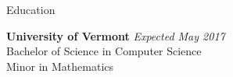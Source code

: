 \documentclass{resume} %
\begin{document}

\begin{rSection}{Education}

{\bf University of Vermont} \hfill {\em Expected May 2017} \\ 
Bachelor of Science in Computer Science \\ %
Minor in Mathematics
\end{rSection}

\end{document}
